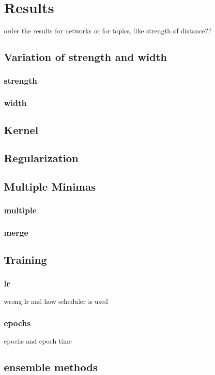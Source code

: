 \chapter{Results}
order the results for networks or for topics, like strength of distance??

\section{Variation of strength and width}
\subsection{strength}
\subsection{width}

\section{Kernel}

\section{Regularization}

\section{Multiple Minimas}
\subsection{multiple}
\subsection{merge}

\section{Training}
\subsection{lr}
wrong lr and how scheduler is used
\subsection{epochs}
epochs and epoch time

\section{ensemble methods}
